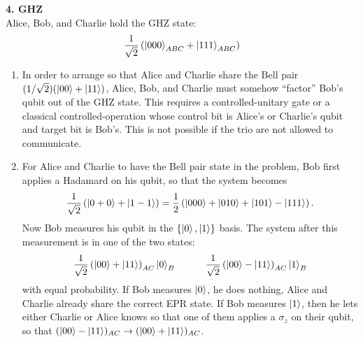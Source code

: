 \documentclass{article}
\theoremstyle{definition}
\newcommand{\f}[2]{\frac{#1}{#2}}
\newcommand{\lp}{\left(}
\newcommand{\rp}{\right)}
\begin{document}
\noindent \textbf{4. GHZ}\\

Alice, Bob, and Charlie hold the GHZ state:
\begin{align*}
	\f{1}{\sqrt{2}} \lp \ket{000}_{ABC} + \ket{111}_{ABC} \rp
\end{align*}


\begin{enumerate}[label=(\alph*)]
	
	\item In order to arrange so that Alice and Charlie share the Bell pair $(1/\sqrt{2})(\ket{00} + \ket{11})$, Alice, Bob, and Charlie must somehow ``factor'' Bob's qubit out of the GHZ state. This requires a controlled-unitary gate or a classical controlled-operation whose control bit is Alice's or Charlie's qubit and target bit is Bob's. This is not possible if the trio are not allowed to communicate.
	
	\item For Alice and Charlie to have the Bell pair state in the problem, Bob first applies a Hadamard on his qubit, so that the system becomes
	\begin{align*}
		\f{1}{\sqrt{2}}\lp \ket{0+0} + \ket{1-1} \rp = \f{1}{2}\lp \ket{000} + \ket{010} + \ket{101} - \ket{111}  \rp.
	\end{align*}
	Now Bob measures his qubit in the $\{ \ket{0}, \ket{1}  \}$ basis. The system after this measurement is in one of the two states:
	\begin{align*}
		\f{1}{\sqrt{2}}\lp \ket{00} + \ket{11} \rp_{AC}\ket{0}_B \quad\quad\quad \f{1}{\sqrt{2}}\lp \ket{00} - \ket{11} \rp_{AC} \ket{1}_B
	\end{align*}
	with equal probability. If Bob measures $\ket{0}$, he does nothing, Alice and Charlie already share the correct EPR state. If Bob measures $\ket{1}$, then he lets either Charlie or Alice knows so that one of them applies a $\sigma_z$ on their qubit, so that $(\ket{00} - \ket{11})_{AC} \to (\ket{00} + \ket{11})_{AC}$. 
\end{enumerate}
\end{document}
